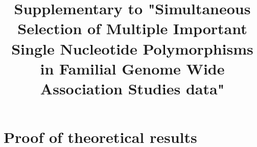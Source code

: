 \documentclass[fleqn,12pt]{article}
\numberwithin{equation}{section}
\begin{document}
\newtheorem{Theorem}{Theorem}[section]
\newtheorem{Lemma}[Theorem]{Lemma}
\newtheorem{Corollary}[Theorem]{Corollary}
\newtheorem{Proposition}[Theorem]{Proposition}
\newtheorem{Conjecture}[Theorem]{Conjecture}
\theoremstyle{definition} \newtheorem{Definition}[Theorem]{Definition}

\title{Supplementary to "Simultaneous Selection of Multiple Important Single Nucleotide Polymorphisms in Familial Genome Wide Association Studies data"}
\date{}
\maketitle

\appendix

\section{Proof of theoretical results}
\end{document}
